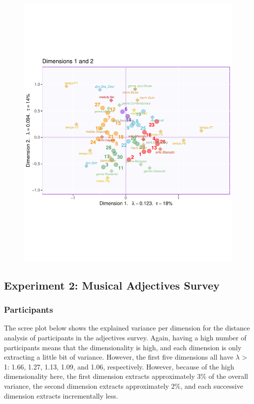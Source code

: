 \documentclass[
  english,
  man,floatsintext]{apa6}
\begin{document}
\begin{figure}

{\centering \includegraphics[width=1\linewidth]{Music-Descriptor-Space_files/figure-latex/factormapswsimplexQ-1} 

}

\caption{ }\label{fig:factormapswsimplexQ}
\end{figure}

\hypertarget{experiment-2-musical-adjectives-survey}{%
\subsection{Experiment 2: Musical Adjectives Survey}\label{experiment-2-musical-adjectives-survey}}

\hypertarget{participants-2}{%
\subsubsection{Participants}\label{participants-2}}

The scree plot below shows the explained variance per dimension for the distance analysis of participants in the adjectives survey. Again, having a high number of participants means that the dimensionality is high, and each dimension is only extracting a little bit of variance. However, the first five dimensions all have \(\lambda\) \textgreater{} 1: 1.66, 1.27, 1.13, 1.09, and 1.06, respectively. However, because of the high dimensionality here, the first dimension extracts approximately 3\% of the overall variance, the second dimension extracts approximately 2\%, and each successive dimension extracts incrementally less.
\end{document}
